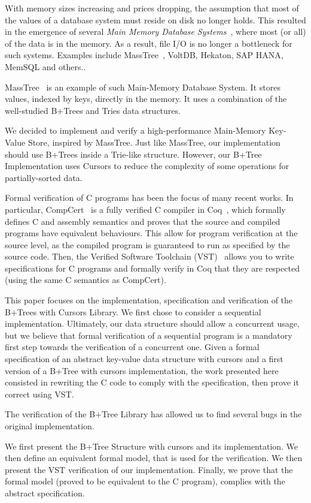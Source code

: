   With memory sizes increasing and prices dropping, the assumption that most of the values of a database system must reside on disk no longer holds.
  This resulted in the emergence of several \textit{Main Memory Database Systems}~\cite{mmdb}, where most (or all) of the data is in the memory.
  As a result, file I/O is no longer a bottleneck for such systems.
  Examples include MassTree~\cite{masstree}, VoltDB, Hekaton, SAP HANA, MemSQL and others..

  MassTree~\cite{masstree} is an example of such Main-Memory Database System.
  It stores values, indexed by keys, directly in the memory.
  It uses a combination of the well-studied  B+Trees and Tries data structures.

  We  decided to implement and verify a high-performance Main-Memory Key-Value Store, inspired by MassTree.
  Just like MassTree, our implementation should use B+Trees inside a Trie-like structure.
  However, our B+Tree Implementation uses Cursors to reduce the complexity of some operations for partially-sorted data.

  Formal verification of C programs has been the focus of many recent works.
  In particular, CompCert~\cite{compcert} is a fully verified C compiler in Coq~\cite{coq}, which formally defines C and assembly semantics and proves that the source and compiled programs have equivalent behaviours.
  This allow for program verification at the source level, as the compiled program is guaranteed to run as specified by the source code.
  Then, the Verified Software Toolchain (VST)~\cite{vst} allows you to write specifications for C programs and formally verify in Coq that they are respected (using the same C semantics as CompCert).

  This paper focuses on the implementation, specification and verification of the B+Trees with Cursors Library. We first chose to consider a sequential implementation.
  Ultimately, our data structure should allow a concurrent usage, but we believe that formal verification of a sequential program is a mandatory first step towards the verification of a concurrent one.
  Given a formal specification of an abstract key-value data structure with cursors and a first version of a B+Tree with cursors implementation, the work presented here consisted in rewriting the C code to comply with the specification, then prove it correct using VST.

  The verification of the B+Tree Library has allowed us to find several bugs in the original implementation.

  We first present the B+Tree Structure with cursors and its implementation.
  We then define an equivalent formal model, that is used for the verification.
  We then present the VST verification of our implementation.
  Finally, we prove that the formal model (proved to be equivalent to the C program), complies with the abstract specification.
